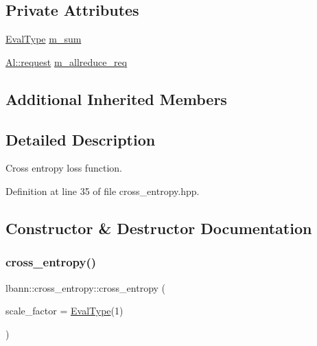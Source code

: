\subsection*{Private Attributes}
\begin{DoxyCompactItemize}
\item 
\hyperlink{base_8hpp_a3266f5ac18504bbadea983c109566867}{Eval\+Type} \hyperlink{classlbann_1_1cross__entropy_a0eea3d755b963149cb364e722a7352d8}{m\+\_\+sum}
\item 
\hyperlink{structlbann_1_1Al_1_1request}{Al\+::request} \hyperlink{classlbann_1_1cross__entropy_a982d913d892cd9043325e2cc6a77f039}{m\+\_\+allreduce\+\_\+req}
\end{DoxyCompactItemize}
\subsection*{Additional Inherited Members}


\subsection{Detailed Description}
Cross entropy loss function. 

Definition at line 35 of file cross\+\_\+entropy.\+hpp.



\subsection{Constructor \& Destructor Documentation}
\mbox{\label{classlbann_1_1cross__entropy_a68520e75b1613caa6e845b26199df0ee}} 
\subsubsection{\texorpdfstring{cross\+\_\+entropy()}{cross\_entropy()}\hspace{0.1cm}{\footnotesize\ttfamily [1/2]}}
{\footnotesize\ttfamily lbann\+::cross\+\_\+entropy\+::cross\+\_\+entropy (\begin{DoxyParamCaption}\item[{\hyperlink{base_8hpp_a3266f5ac18504bbadea983c109566867}{Eval\+Type}}]{scale\+\_\+factor = {\ttfamily \hyperlink{base_8hpp_a3266f5ac18504bbadea983c109566867}{Eval\+Type}(1)} }\end{DoxyParamCaption})\hspace{0.3cm}{\ttfamily [inline]}}

